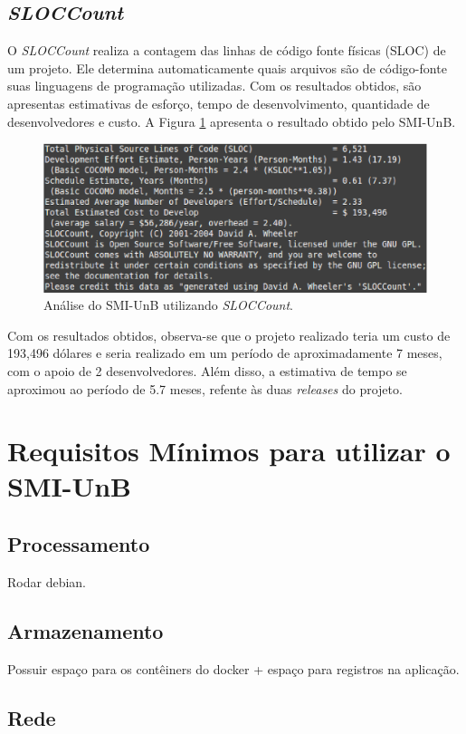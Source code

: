 \subsection{\textit{SLOCCount}}
O \textit{SLOCCount} realiza a contagem das linhas de código fonte físicas (SLOC) de um projeto. Ele determina automaticamente quais arquivos são de código-fonte suas linguagens de programação utilizadas. Com os resultados obtidos, são apresentas estimativas de esforço, tempo de desenvolvimento, quantidade de desenvolvedores e custo. A Figura \ref{sloc} apresenta o resultado obtido pelo SMI-UnB.

\begin{figure}[!h]
    \centering
    \includegraphics[keepaspectratio=true,scale=0.7]{figuras/sloc.eps}
    \caption{Análise do SMI-UnB utilizando \textit{SLOCCount}.}
    \label{sloc}
\end{figure}

Com os resultados obtidos, observa-se que o projeto realizado teria um custo de 193,496 dólares e seria realizado em um período de aproximadamente 7 meses, com o apoio de 2 desenvolvedores. Além disso, a estimativa de tempo se aproximou ao período de 5.7 meses, refente às duas \textit{releases} do projeto.

\section{Requisitos Mínimos para utilizar o SMI-UnB}
    \subsection{Processamento}
    Rodar debian.
    \subsection{Armazenamento}
    Possuir espaço para os contêiners do docker + espaço para registros na aplicação.
    \subsection{Rede}
